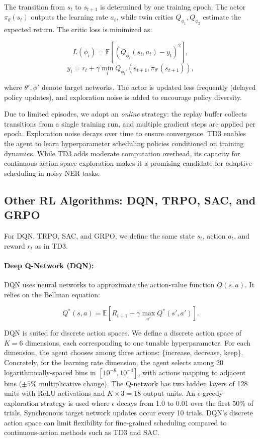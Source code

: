 \documentclass[11pt]{article}
\begin{document}
The transition from $s_t$ to $s_{t+1}$ is determined by one training epoch. The actor $\pi_\theta(s_t)$ outputs the learning rate $a_t$, while twin critics $Q_{\phi_1}, Q_{\phi_2}$ estimate the expected return. The critic loss is minimized as:

\[
L(\phi_i) = \mathbb{E}\left[(Q_{\phi_i}(s_t, a_t) - y_t)^2\right],
\]
\[
y_t = r_t + \gamma \min_{i} Q_{\phi_i'}(s_{t+1}, \pi_{\theta'}(s_{t+1})),
\]

where $\theta', \phi'$ denote target networks. The actor is updated less frequently (delayed policy updates), and exploration noise is added to encourage policy diversity.

Due to limited episodes, we adopt an \textit{online} strategy: the replay buffer collects transitions from a single training run, and multiple gradient steps are applied per epoch. Exploration noise decays over time to ensure convergence. TD3 enables the agent to learn hyperparameter scheduling policies conditioned on training dynamics. While TD3 adds moderate computation overhead, its capacity for continuous action space exploration makes it a promising candidate for adaptive scheduling in noisy NER tasks.

\subsection{Other RL Algorithms: DQN, TRPO, SAC, and GRPO}

For DQN, TRPO, SAC, and GRPO, we define the same state $s_t$, action $a_t$, and reward $r_t$ as in TD3.

\paragraph{Deep Q-Network (DQN):} DQN uses neural networks to approximate the action-value function $Q(s,a)$. It relies on the Bellman equation:

\[
Q^*(s, a) = \mathbb{E} \left[ R_{t+1} + \gamma \max_{a'} Q^*(s', a') \right].
\]

DQN is suited for discrete action spaces. We define a discrete action space of $K = 6$ dimensions, each corresponding to one tunable hyperparameter. For each dimension, the agent chooses among three actions: \{increase, decrease, keep\}. Concretely, for the learning rate dimension, the agent selects among 20 logarithmically-spaced bins in $[10^{-6}, 10^{-4}]$, with actions mapping to adjacent bins ($\pm 5\%$ multiplicative change). The Q-network has two hidden layers of 128 units with ReLU activations and $K \times 3 = 18$ output units. An $\epsilon$-greedy exploration strategy is used where $\epsilon$ decays from 1.0 to 0.01 over the first 50\% of trials. Synchronous target network updates occur every 10 trials. DQN's discrete action space can limit flexibility for fine-grained scheduling compared to continuous-action methods such as TD3 and SAC.
\end{document}
